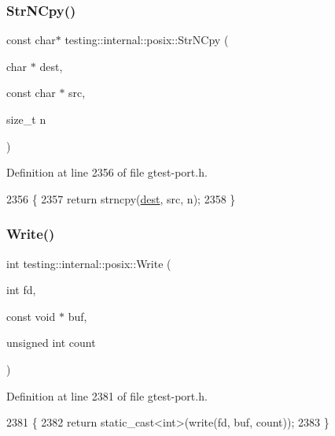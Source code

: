 \subsubsection{\texorpdfstring{Str\+N\+Cpy()}{StrNCpy()}}
{\footnotesize\ttfamily const char$\ast$ testing\+::internal\+::posix\+::\+Str\+N\+Cpy (\begin{DoxyParamCaption}\item[{char $\ast$}]{dest,  }\item[{const char $\ast$}]{src,  }\item[{size\+\_\+t}]{n }\end{DoxyParamCaption})\hspace{0.3cm}{\ttfamily [inline]}}



Definition at line 2356 of file gtest-\/port.\+h.


\begin{DoxyCode}
2356                                                                   \{
2357   \textcolor{keywordflow}{return} strncpy(\hyperlink{namespaceupload_a770d9c7b49b1fede80de6078d5e49af7}{dest}, src, n);
2358 \}
\end{DoxyCode}
\mbox{\label{namespacetesting_1_1internal_1_1posix_af4acf9f78d55f815a18b43786511abef}} 
\subsubsection{\texorpdfstring{Write()}{Write()}}
{\footnotesize\ttfamily int testing\+::internal\+::posix\+::\+Write (\begin{DoxyParamCaption}\item[{int}]{fd,  }\item[{const void $\ast$}]{buf,  }\item[{unsigned int}]{count }\end{DoxyParamCaption})\hspace{0.3cm}{\ttfamily [inline]}}



Definition at line 2381 of file gtest-\/port.\+h.


\begin{DoxyCode}
2381                                                               \{
2382   \textcolor{keywordflow}{return} \textcolor{keyword}{static\_cast<}\textcolor{keywordtype}{int}\textcolor{keyword}{>}(write(fd, buf, count));
2383 \}
\end{DoxyCode}
